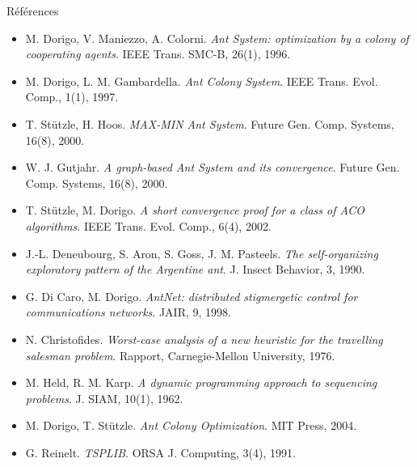 \documentclass[aspectratio=169,11pt]{beamer}
\begin{document}
\begin{frame}{Références}
  \scriptsize
  \begin{itemize}\setlength{\itemsep}{0pt}
    \item M. Dorigo, V. Maniezzo, A. Colorni. \emph{Ant System: optimization by a colony of
          cooperating agents}. IEEE Trans. SMC-B, 26(1), 1996.
    \item M. Dorigo, L. M. Gambardella. \emph{Ant Colony System}. IEEE Trans. Evol. Comp., 1(1), 1997.
    \item T. Stützle, H. Hoos. \emph{MAX-MIN Ant System}. Future Gen. Comp. Systems, 16(8), 2000.
    \item W. J. Gutjahr. \emph{A graph-based Ant System and its convergence}.
          Future Gen. Comp. Systems, 16(8), 2000.
    \item T. Stützle, M. Dorigo. \emph{A short convergence proof for a class of ACO algorithms}.
          IEEE Trans. Evol. Comp., 6(4), 2002.
    \item J.-L. Deneubourg, S. Aron, S. Goss, J. M. Pasteels. \emph{The self-organizing
          exploratory pattern of the Argentine ant}. J. Insect Behavior, 3, 1990.
    \item G. Di Caro, M. Dorigo. \emph{AntNet: distributed stigmergetic control for
          communications networks}. JAIR, 9, 1998.
    \item N. Christofides. \emph{Worst-case analysis of a new heuristic for the travelling
          salesman problem}. Rapport, Carnegie-Mellon University, 1976.
    \item M. Held, R. M. Karp. \emph{A dynamic programming approach to sequencing problems}.
          J. SIAM, 10(1), 1962.
    \item M. Dorigo, T. Stützle. \emph{Ant Colony Optimization}. MIT Press, 2004.
    \item G. Reinelt. \emph{TSPLIB}. ORSA J. Computing, 3(4), 1991.
  \end{itemize}
\end{frame}
\end{document}
